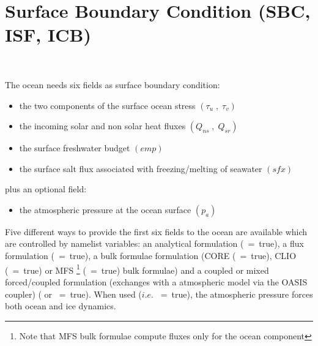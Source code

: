 \documentclass[NEMO_book]{subfiles}
\begin{document}
\chapter{Surface Boundary Condition (SBC, ISF, ICB) }
\label{SBC}
\minitoc

\newpage
$\ $\newline    %
$\ $\newline    %

The ocean needs six fields as surface boundary condition:
\begin{itemize}
	\item the two components of the surface ocean stress $\left( {\tau _u \;,\;\tau _v} \right)$
	\item the incoming solar and non solar heat fluxes $\left( {Q_{ns} \;,\;Q_{sr} } \right)$
	\item the surface freshwater budget $\left( {\textit{emp}} \right)$
	\item the surface salt flux associated with freezing/melting of seawater $\left( {\textit{sfx}} \right)$
\end{itemize}
plus an optional field:
\begin{itemize}
	\item the atmospheric pressure at the ocean surface $\left( p_a \right)$
\end{itemize}

Five different ways to provide the first six fields to the ocean are available which 
are controlled by namelist  variables: an analytical formulation (~=~true), 
a flux formulation (~=~true), a bulk formulae formulation (CORE 
(~=~true), CLIO (~=~true) or MFS
\footnote { Note that MFS bulk formulae compute fluxes only for the ocean component}
(~=~true) bulk formulae) and a coupled or mixed forced/coupled formulation 
(exchanges with a atmospheric model via the OASIS coupler) ( or ~=~true). 
When used ($i.e.$ ~=~true), the atmospheric pressure forces both ocean and ice dynamics.
\end{document}

